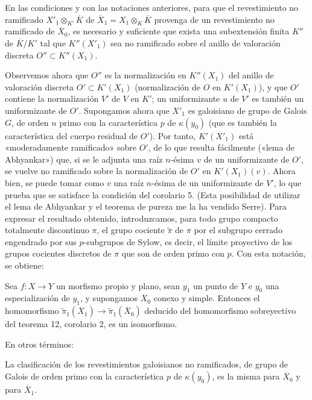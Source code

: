  En las condiciones y con las notaciones anteriores, para
que el revestimiento no ramificado
$X'_1\otimes_{K'}\overline K$ de
$\overline X_1=X_1\otimes_K\overline K$ provenga de un revestimiento no
ramificado de $\overline X_0$, es necesario y suficiente que exista una
subextensión finita $K''$ de $\overline K/K'$ tal que $K''(X'_1)$ sea no
ramificado sobre el anillo de valoración discreta $O''\subset K''(X_1)$.

Observemos ahora que $O''$ es la normalización en $K''(X_1)$ del anillo de
valoración discreta $O'\subset K'(X_1)$ (normalización de $O$ en $K'(X_1)$), y
que $O'$ contiene la normalización $V'$ de $V$ en $K'$; un uniformizante $u$ de
$V'$ es también un uniformizante de $O'$. Supongamos ahora que $X'_1$ es
galoisiano de grupo de Galois $G$, de orden $n$ primo con la característica $p$
de $\kappa(y_0)$ (que es también la característica del cuerpo residual de
$O'$). Por tanto, $K'(X'_1)$ está «moderadamente ramificado» sobre $O'$, de lo
que resulta fácilmente («lema de Abhyankar») que, si se le adjunta una raíz
$n$-ésima $v$ de un uniformizante de $O'$, se vuelve no ramificado sobre la
normalización de $O'$ en $K'(X_1)(v)$. Ahora bien, se puede tomar como $v$ una
raíz $n$-ésima de un uniformizante de $V'$, lo que prueba que se satisface la
condición del corolario 5. (Esta posibilidad de utilizar el lema de Abhyankar y
el teorema de pureza me la ha vendido Serre). Para expresar el resultado
obtenido, introduzcamos, para todo grupo compacto totalmente discontinuo $\pi$,
el grupo cociente $\widetilde\pi$ de $\pi$ por el subgrupo cerrado engendrado
por sus $p$-subgrupos de Sylow, es decir, el límite proyectivo de los grupos
cocientes discretos de $\pi$ que son de orden primo con $p$. Con esta notación,
se obtiene:

 Sea $f:X\longrightarrow Y$ un morfismo propio y plano,
sean $y_1$ un punto de $Y$ e $y_0$ una especialización de $y_1$, y supongamos
$\overline X_0$ conexo y simple. Entonces el homomorfismo
$\widetilde\pi_1(\overline X_1)\longrightarrow
\widetilde\pi_1(\overline X_0)$ deducido del homomorfismo sobreyectivo del
teorema 12, corolario 2, es un isomorfismo.

En otros términos:

 La clasificación de los revestimientos galoisianos no
ramificados, de grupo de Galois de orden primo con la característica $p$ de
$\kappa(y_0)$, es la misma para $\overline X_0$ y para $\overline X_1$.

